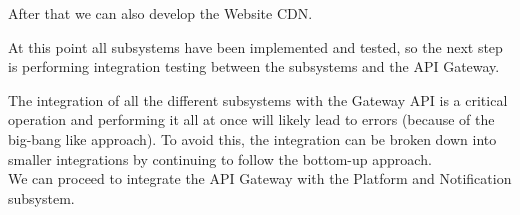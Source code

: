 \begin{adjustbox}{
        max size={\textwidth}{},
        center,
        caption={Build and Test subsystem},
        label={fig:Build and Test subsystem},
        figure=H}
\end{adjustbox}

\begin{adjustbox}{
        max size={\textwidth}{},
        center,
        caption={Static Analysis subsystem},
        label={fig:Static Analysis  subsystem},
        figure=H}
\end{adjustbox}

\begin{adjustbox}{
        max size={\textwidth}{},
        center,
        caption={Badge subsystem},
        label={fig:Badge subsystem},
        figure=H}
\end{adjustbox}

After that we can also develop the Website CDN.
\begin{adjustbox}{
        max size={\textwidth}{},
        center,
        caption={Website CDN subsystem},
        label={fig:Website CDN subsystem},
        figure=H}
\end{adjustbox}

At this point all subsystems have been implemented and tested, so the next step is performing integration
testing between the subsystems and the API Gateway.
\begin{adjustbox}{
        max size={\textwidth}{},
        center,
        caption={API Gateway subsystem},
        label={fig:API Gateway subsystem},
        figure=H}
\end{adjustbox}

The integration of all the different subsystems with the Gateway API is a critical operation and performing it all at once will likely lead to errors (because of the big-bang like approach).
To avoid this, the integration can be broken down into smaller integrations by continuing to follow the bottom-up approach.\\
We can proceed to integrate the API Gateway with the Platform and Notification subsystem.

